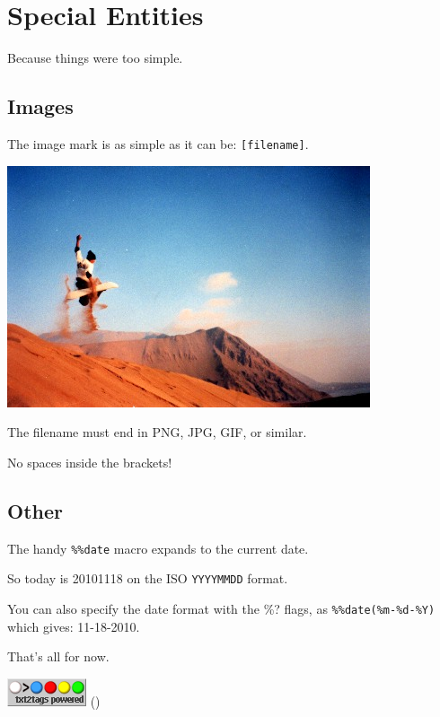 \documentclass{article}
\begin{document}
\section*{Special Entities}

Because things were too simple.

\subsection*{Images}

The image mark is as simple as it can be: \texttt{[filename]}.

                      \includegraphics{img/photo.jpg}  

\begin{compactitem}
\item The filename must end in PNG, JPG, GIF, or similar.
\item No spaces inside the brackets!
\end{compactitem}

\subsection*{Other}

The handy \texttt{\%\%date} macro expands to the current date.

So today is 20101118 on the ISO \texttt{YYYYMMDD} format.

You can also specify the date format with the \%? flags,
as \texttt{\%\%date(\%m-\%d-\%Y)} which gives: 11-18-2010.

That's all for now.

\hrulefill{}

\includegraphics{img/t2tpowered.png} ()

\end{document}
